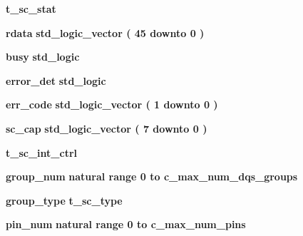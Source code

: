 \begin{DoxyCompactItemize}
\item 
{\bf t\+\_\+sc\+\_\+stat} {\bfseries  }
\item 
{\bf rdata} {\bfseries {\bfseries \textcolor{comment}{std\+\_\+logic\+\_\+vector}\textcolor{vhdlchar}{ }\textcolor{vhdlchar}{(}\textcolor{vhdlchar}{ }\textcolor{vhdlchar}{ } \textcolor{vhdldigit}{45} \textcolor{vhdlchar}{ }\textcolor{keywordflow}{downto}\textcolor{vhdlchar}{ }\textcolor{vhdlchar}{ } \textcolor{vhdldigit}{0} \textcolor{vhdlchar}{ }\textcolor{vhdlchar}{)}\textcolor{vhdlchar}{ }}} 
\item 
{\bf busy} {\bfseries {\bfseries \textcolor{comment}{std\+\_\+logic}\textcolor{vhdlchar}{ }}} 
\item 
{\bf error\+\_\+det} {\bfseries {\bfseries \textcolor{comment}{std\+\_\+logic}\textcolor{vhdlchar}{ }}} 
\item 
{\bf err\+\_\+code} {\bfseries {\bfseries \textcolor{comment}{std\+\_\+logic\+\_\+vector}\textcolor{vhdlchar}{ }\textcolor{vhdlchar}{(}\textcolor{vhdlchar}{ }\textcolor{vhdlchar}{ } \textcolor{vhdldigit}{1} \textcolor{vhdlchar}{ }\textcolor{keywordflow}{downto}\textcolor{vhdlchar}{ }\textcolor{vhdlchar}{ } \textcolor{vhdldigit}{0} \textcolor{vhdlchar}{ }\textcolor{vhdlchar}{)}\textcolor{vhdlchar}{ }}} 
\item 
{\bf sc\+\_\+cap} {\bfseries {\bfseries \textcolor{comment}{std\+\_\+logic\+\_\+vector}\textcolor{vhdlchar}{ }\textcolor{vhdlchar}{(}\textcolor{vhdlchar}{ }\textcolor{vhdlchar}{ } \textcolor{vhdldigit}{7} \textcolor{vhdlchar}{ }\textcolor{keywordflow}{downto}\textcolor{vhdlchar}{ }\textcolor{vhdlchar}{ } \textcolor{vhdldigit}{0} \textcolor{vhdlchar}{ }\textcolor{vhdlchar}{)}\textcolor{vhdlchar}{ }}} 
\item 
{\bf t\+\_\+sc\+\_\+int\+\_\+ctrl} {\bfseries  }
\item 
{\bf group\+\_\+num} {\bfseries {\bfseries \textcolor{comment}{natural}\textcolor{vhdlchar}{ }\textcolor{vhdlchar}{ }\textcolor{vhdlchar}{ }\textcolor{keywordflow}{range}\textcolor{vhdlchar}{ }\textcolor{vhdlchar}{ } \textcolor{vhdldigit}{0} \textcolor{vhdlchar}{ }\textcolor{keywordflow}{to}\textcolor{vhdlchar}{ }\textcolor{vhdlchar}{ }\textcolor{vhdlchar}{ }\textcolor{vhdlchar}{ }{\bfseries {\bf c\+\_\+max\+\_\+num\+\_\+dqs\+\_\+groups}} \textcolor{vhdlchar}{ }}} 
\item 
{\bf group\+\_\+type} {\bfseries {\bfseries {\bfseries {\bf t\+\_\+sc\+\_\+type}} \textcolor{vhdlchar}{ }}} 
\item 
{\bf pin\+\_\+num} {\bfseries {\bfseries \textcolor{comment}{natural}\textcolor{vhdlchar}{ }\textcolor{vhdlchar}{ }\textcolor{vhdlchar}{ }\textcolor{keywordflow}{range}\textcolor{vhdlchar}{ }\textcolor{vhdlchar}{ } \textcolor{vhdldigit}{0} \textcolor{vhdlchar}{ }\textcolor{keywordflow}{to}\textcolor{vhdlchar}{ }\textcolor{vhdlchar}{ }\textcolor{vhdlchar}{ }\textcolor{vhdlchar}{ }{\bfseries {\bf c\+\_\+max\+\_\+num\+\_\+pins}} \textcolor{vhdlchar}{ }}} 

\end{DoxyCompactItemize}
